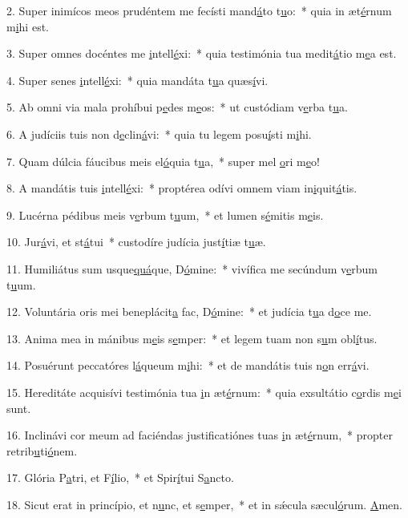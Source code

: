 2. Super inimícos meos prudéntem me fecísti mand\uline{á}to t\uline{u}o:~* quia in æt\uline{é}rnum m\uline{i}hi est.\par 
3. Super omnes docéntes me \uline{i}ntell\uline{é}xi:~* quia testimónia tua medit\uline{á}tio m\uline{e}a est.\par 
4. Super senes \uline{i}ntell\uline{é}xi:~* quia mandáta t\uline{u}a quæs\uline{í}vi.\par 
5. Ab omni via mala prohíbui p\uline{e}des m\uline{e}os:~* ut custódiam v\uline{e}rba t\uline{u}a.\par 
6. A judíciis tuis non d\uline{e}clin\uline{á}vi:~* quia tu legem posu\uline{í}sti m\uline{i}hi.\par 
7. Quam dúlcia fáucibus meis el\uline{ó}quia t\uline{u}a,~* super mel \uline{o}ri m\uline{e}o!\par 
8. A mandátis tuis \uline{i}ntell\uline{é}xi:~* proptérea odívi omnem viam in\uline{i}quit\uline{á}tis.\par 
9. Lucérna pédibus meis v\uline{e}rbum t\uline{u}um,~* et lumen s\uline{é}mitis m\uline{e}is.\par 
10. Jur\uline{á}vi, et st\uline{á}tui~* custodíre judícia just\uline{í}tiæ t\uline{u}æ.\par 
11. Humiliátus sum usque\uline{quá}que, D\uline{ó}mine:~* vivífica me secúndum v\uline{e}rbum t\uline{u}um.\par 
12. Voluntária oris mei beneplácit\uline{a} fac, D\uline{ó}mine:~* et judícia t\uline{u}a d\uline{o}ce me.\par 
13. Anima mea in mánibus m\uline{e}is s\uline{e}mper:~* et legem tuam non s\uline{u}m obl\uline{í}tus.\par 
14. Posuérunt peccatóres l\uline{á}queum m\uline{i}hi:~* et de mandátis tuis n\uline{o}n err\uline{á}vi.\par 
15. Hereditáte acquisívi testimónia tua \uline{i}n æt\uline{é}rnum:~* quia exsultátio c\uline{o}rdis m\uline{e}i sunt.\par 
16. Inclinávi cor meum ad faciéndas justificatiónes tuas \uline{i}n æt\uline{é}rnum,~* propter retrib\uline{u}ti\uline{ó}nem.\par 
17. Glória P\uline{a}tri, et F\uline{í}lio,~* et Spir\uline{í}tui S\uline{a}ncto.\par 
18. Sicut erat in princípio, et n\uline{u}nc, et s\uline{e}mper,~* et in sǽcula sæcul\uline{ó}rum. \uline{A}men.\par 
